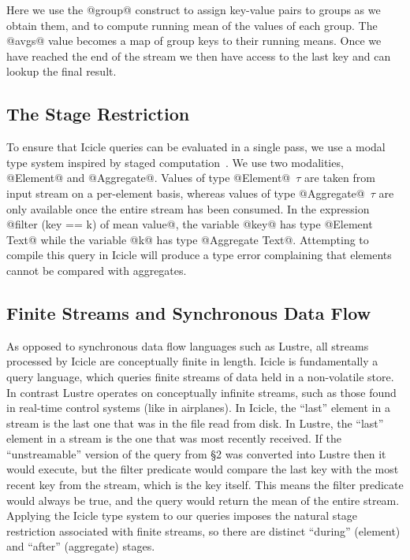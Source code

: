 Here we use the @group@ construct to assign key-value pairs to groups as we obtain them, and to compute running mean of the values of each group. The @avgs@ value becomes a map of group keys to their running means. Once we have reached the end of the stream we then have access to the last key and can lookup the final result.


\subsection{The Stage Restriction}
To ensure that Icicle queries can be evaluated in a single pass, we use a modal type system inspired by staged computation~\cite{davies2001modal}. We use two modalities, @Element@ and @Aggregate@. Values of type @Element@~$\tau$ are taken from input stream on a per-element basis, whereas values of type @Aggregate@~$\tau$ are only available once the entire stream has been consumed. In the expression @filter (key == k) of mean value@, the variable @key@ has type @Element Text@ while the variable @k@ has type @Aggregate Text@. Attempting to compile this query in Icicle will produce a type error complaining that elements cannot be compared with aggregates.


\subsection{Finite Streams and Synchronous Data Flow}
As opposed to synchronous data flow languages such as {\sc Lustre}\cite{halbwachs1991synchronous}, all streams processed by Icicle are conceptually finite in length. Icicle is fundamentally a query language, which queries finite streams of data held in a non-volatile store. In contrast Lustre operates on conceptually infinite streams, such as those found in real-time control systems (like in airplanes). In Icicle, the ``last'' element in a stream is the last one that was in the file read from disk. In Lustre, the ``last'' element in a stream is the one that was most recently received. If the ``unstreamable'' version of the query from \S2 was converted into Lustre then it would execute, but the filter predicate would compare the last key with the most recent key from the stream, which is the key itself. This means the filter predicate would always be true, and the query would return the mean of the entire stream. Applying the Icicle type system to our queries imposes the natural stage restriction associated with finite streams, so there are distinct ``during'' (element) and ``after'' (aggregate) stages.


